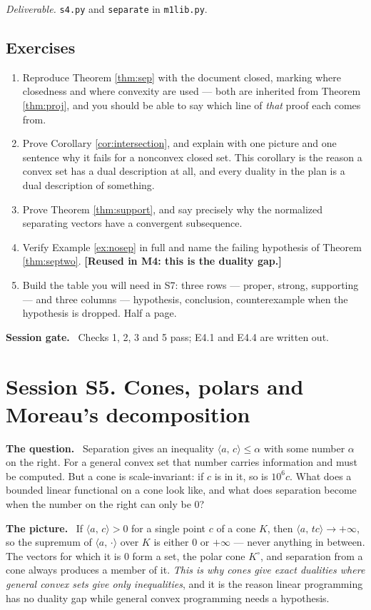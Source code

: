\documentclass[11pt,a4paper]{article}
\newcommand{\mpart}[1]{\smallskip\noindent\textbf{#1}\ \ignorespaces}
\theoremstyle{definition}
\theoremstyle{plain}
\theoremstyle{remark}
\newcommand{\ip}[2]{\langle #1,\, #2\rangle}
\begin{document}
\emph{Deliverable.} \texttt{s4.py} and \texttt{separate} in \texttt{m1lib.py}.

\subsection*{Exercises}
\begin{enumerate}[label=E4.\arabic*]
\item Reproduce Theorem \ref{thm:sep} with the document closed, marking where closedness and
where convexity are used --- both are inherited from Theorem \ref{thm:proj}, and you should be
able to say which line of \emph{that} proof each comes from.
\item Prove Corollary \ref{cor:intersection}, and explain with one picture and one sentence why
it fails for a nonconvex closed set. This corollary is the reason a convex set has a dual
description at all, and every duality in the plan is a dual description of something.
\item Prove Theorem \ref{thm:support}, and say precisely why the normalized separating vectors
have a convergent subsequence.
\item Verify Example \ref{ex:nosep} in full and name the failing hypothesis of Theorem
\ref{thm:septwo}. \textbf{[Reused in M4: this is the duality gap.]}
\item Build the table you will need in S7: three rows --- proper, strong, supporting --- and
three columns --- hypothesis, conclusion, counterexample when the hypothesis is dropped. Half a
page.
\end{enumerate}

\mpart{Session gate.} Checks 1, 2, 3 and 5 pass; E4.1 and E4.4 are written out.

\clearpage

\section{Session S5. Cones, polars and Moreau's decomposition}

\mpart{The question.} Separation gives an inequality $\ip{a}{c}\le\alpha$ with some number
$\alpha$ on the right. For a general convex set that number carries information and must be
computed. But a cone is scale-invariant: if $c$ is in it, so is $10^6c$. What does a bounded
linear functional on a cone look like, and what does separation become when the number on the
right can only be $0$?

\mpart{The picture.} If $\ip{a}{c}>0$ for a single point $c$ of a cone $K$, then
$\ip{a}{tc}\to+\infty$, so the supremum of $\ip{a}{\cdot}$ over $K$ is either $0$ or $+\infty$
--- never anything in between. The vectors for which it is $0$ form a set, the polar cone
$K^\circ$, and separation from a cone always produces a member of it. \emph{This is why cones
give exact dualities where general convex sets give only inequalities}, and it is the reason
linear programming has no duality gap while general convex programming needs a hypothesis.
\end{document}
